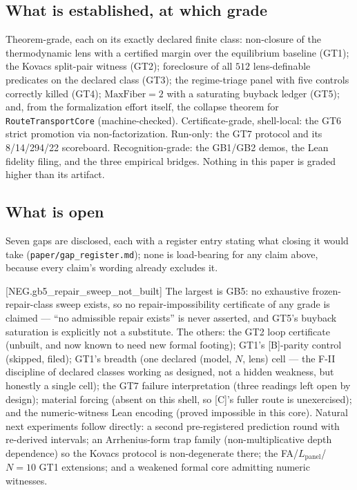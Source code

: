 \documentclass[11pt]{article}
\newcommand{\claimref}[2]{[#1]}
\theoremstyle{definition}
\begin{document}
\subsection{What is established, at which grade}

Theorem-grade, each on its exactly declared finite class: non-closure of the thermodynamic lens
with a certified margin over the equilibrium baseline (GT1); the Kovacs split-pair witness (GT2);
foreclosure of all $512$ lens-definable predicates on the declared class (GT3); the regime-triage
panel with five controls correctly killed (GT4); $\mathrm{MaxFiber}=2$ with a saturating buyback
ledger (GT5); and, from the formalization effort itself, the collapse theorem for
\texttt{RouteTransportCore} (machine-checked). Certificate-grade, shell-local: the GT6 strict
promotion via non-factorization. Run-only: the GT7 protocol and its 8/14/294/22 scoreboard.
Recognition-grade: the GB1/GB2 demos, the Lean fidelity filing, and the three empirical bridges.
Nothing in this paper is graded higher than its artifact.

\subsection{What is open}

Seven gaps are disclosed, each with a register entry stating what closing it would take
(\texttt{paper/gap\_register.md}); none is load-bearing for any claim above, because every claim's
wording already excludes it.

\claimref{NEG.gb5\_repair\_sweep\_not\_built}{3f3c56405847a079f48bae350b3b35e901a5731470bcb4a092bd7f682f075559}
The largest is GB5: no exhaustive frozen-repair-class sweep exists, so no repair-impossibility
certificate of any grade is claimed --- ``no admissible repair exists'' is never asserted, and GT5's
buyback saturation is explicitly not a substitute. The others: the GT2 loop certificate (unbuilt,
and now known to need new formal footing); GT1's [B]-parity control (skipped, filed); GT1's breadth
(one declared (model, $N$, lens) cell --- the F-II discipline of declared classes working as
designed, not a hidden weakness, but honestly a single cell); the GT7 failure interpretation
(three readings left open by design); material forcing (absent on this shell, so [C]'s fuller
route is unexercised); and the numeric-witness Lean encoding (proved impossible in this core).
Natural next experiments follow directly: a second pre-registered prediction round with
re-derived intervals; an Arrhenius-form trap family (non-multiplicative depth dependence) so the
Kovacs protocol is non-degenerate there; the FA/$L_{\mathrm{panel}}$/$N{=}10$ GT1 extensions; and
a weakened formal core admitting numeric witnesses.
\end{document}
